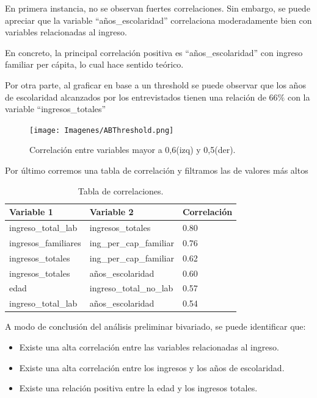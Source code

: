 \documentclass[a4paper]{article}
\begin{document}
        En primera instancia, no se observan fuertes correlaciones. Sin embargo, se puede apreciar que la variable ``años\_escolaridad'' correlaciona moderadamente bien con variables relacionadas al ingreso.
 
        En concreto, la principal correlación positiva es ``años\_escolaridad'' con ingreso familiar per cápita, lo cual hace sentido teórico.
        
        Por otra parte, al graficar en base a un threshold se puede observar que los años de escolaridad alcanzados por los entrevistados tienen una relación de $66\%$ con la variable ``ingresos\_totales''

        \begin{figure}[H]
            \centering
            \texttt{[image: Imagenes/ABThreshold.png]}
            \caption{Correlación entre variables mayor a 0,6(izq) y 0,5(der).}
            \label{AB Treshold Correlation}
        \end{figure}
 
        Por último corremos una tabla de correlación y filtramos las de valores más altos
 
        \begin{table}[H]
            \centering
            \begin{tabular}{|l|l|l|}
            \hline
                Variable 1 & Variable 2 & Correlación \\ \hline
                ingreso\_total\_lab & ingresos\_totales & 0.80 \\ \hline
                ingresos\_familiares & ing\_per\_cap\_familiar & 0.76 \\ \hline
                ingresos\_totales & ing\_per\_cap\_familiar & 0.62 \\ \hline
                ingresos\_totales & años\_escolaridad & 0.60 \\ \hline
                edad & ingreso\_total\_no\_lab & 0.57 \\ \hline
                ingreso\_total\_lab & años\_escolaridad & 0.54 \\ \hline
            \end{tabular}
            \caption{Tabla de correlaciones.}
            \label{AB Correlation Table}
        \end{table}
 
        A modo de conclusión del análisis preliminar bivariado, se puede identificar que:
        \begin{itemize}
            \item Existe una alta correlación entre las variables relacionadas al ingreso.
            \item Existe una alta correlación entre los ingresos y los años de escolaridad.
            \item Existe una relación positiva entre la edad y los ingresos totales.
        \end{itemize}
        
\end{document}
